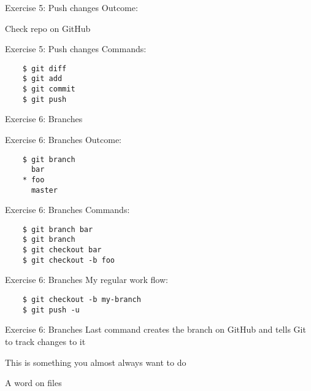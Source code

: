\documentclass{beamer}
\begin{document}
\begin{frame}{Exercise 5: Push changes}
  Outcome:

  Check repo on GitHub
\end{frame}

\begin{frame}[fragile]{Exercise 5: Push changes}
  Commands:

  \begin{verbatim}
    $ git diff
    $ git add
    $ git commit
    $ git push
  \end{verbatim}
\end{frame}

\begin{frame}{}
  \center
  \Huge Exercise 6: Branches
\end{frame}

\begin{frame}[fragile]{Exercise 6: Branches}
  Outcome:

  \begin{verbatim}
    $ git branch
      bar
    * foo
      master
  \end{verbatim}
\end{frame}

\begin{frame}[fragile]{Exercise 6: Branches}
  Commands:

  \begin{verbatim}
    $ git branch bar
    $ git branch
    $ git checkout bar
    $ git checkout -b foo
  \end{verbatim}
\end{frame}

\begin{frame}[fragile]{Exercise 6: Branches}
  My regular work flow:

  \begin{verbatim}
    $ git checkout -b my-branch
    $ git push -u
  \end{verbatim}
\end{frame}

\begin{frame}{Exercise 6: Branches}
  \center
  \Large
  Last command creates the branch on GitHub and tells Git to track changes to it
  \pause

  This is something you almost always want to do

\end{frame}

\begin{frame}{}
  \center
  \Huge A word on files
\end{frame}
\end{document}
